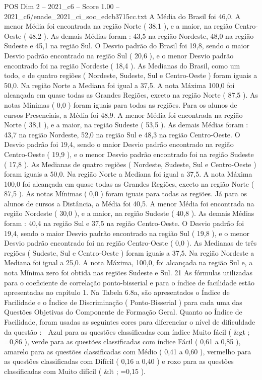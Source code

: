 \begin{textsample}{POS Dim 2 – 2021\_c6 – Score 1.00 – 2021\_c6/enade\_2021\_ci\_soc\_edcb3715cc.txt}
A Média do Brasil foi 46,0.
A menor Média foi encontrada na região Norte ( 38,1 ), e a maior, na região Centro-Oeste ( 48,2 ).
As demais Médias foram : 43,5 na região Nordeste, 48,0 na região Sudeste e 45,1 na região Sul.
O Desvio padrão do Brasil foi 19,8, sendo o maior Desvio padrão encontrado na região Sul ( 20,6 ), e o menor Desvio padrão encontrado foi na região Nordeste ( 18,4 ).
As Medianas do Brasil, como um todo, e de quatro regiões ( Nordeste, Sudeste, Sul e Centro-Oeste ) foram iguais a 50,0.
Na região Norte a Mediana foi igual a 37,5.
A nota Máxima 100,0 foi alcançada em quase todas as Grandes Regiões, exceto na região Norte ( 87,5 ).
As notas Mínimas ( 0,0 ) foram iguais para todas as regiões.
Para os alunos de cursos Presenciais, a Média foi 48,9.
A menor Média foi encontrada na região Norte ( 38,1 ), e a maior, na região Sudeste ( 53,5 ).
As demais Médias foram : 43,7 na região Nordeste, 52,0 na região Sul e 48,3 na região Centro-Oeste.
O Desvio padrão foi 19,4, sendo o maior Desvio padrão encontrado na região Centro-Oeste ( 19,9 ), e o menor Desvio padrão encontrado foi na região Sudeste ( 17,8 ).
As Medianas de quatro regiões ( Nordeste, Sudeste, Sul e Centro-Oeste ) foram iguais a 50,0.
Na região Norte a Mediana foi igual a 37,5.
A nota Máxima 100,0 foi alcançada em quase todas as Grandes Regiões, exceto na região Norte ( 87,5 ).
As notas Mínimas ( 0,0 ) foram iguais para todas as regiões.
Já para os alunos de cursos a Distância, a Média foi 40,5.
A menor Média foi encontrada na região Nordeste ( 30,0 ), e a maior, na região Sudeste ( 40,8 ).
As demais Médias foram : 40,4 na região Sul e 37,5 na região Centro-Oeste.
O Desvio padrão foi 19,4, sendo o maior Desvio padrão encontrado na região Sul ( 19,8 ), e o menor Desvio padrão encontrado foi na região Centro-Oeste ( 0,0 ).
As Medianas de três regiões ( Sudeste, Sul e Centro-Oeste ) foram iguais a 37,5.
Na região Nordeste a Mediana foi igual a 25,0.
A nota Máxima, 100,0, foi alcançada na região Sul e, a nota Mínima zero foi obtida nas regiões Sudeste e Sul. 21 As fórmulas utilizadas para o coeficiente de correlação ponto-bisserial e para o índice de facilidade estão apresentadas no capítulo 1.
Na Tabela 6.8a, são apresentados o Índice de Facilidade e o Índice de Discriminação ( Ponto-Bisserial ) para cada uma das Questões Objetivas do Componente de Formação Geral.
Quanto ao Índice de Facilidade, foram usadas as seguintes cores para diferenciar o nível de dificuldade da questão :  Azul para as questões classificadas com índice Muito fácil ( \&gt ; =0,86 ), verde para as questões classificadas com índice Fácil ( 0,61 a 0,85 ), amarelo para as questões classificadas com Médio ( 0,41 a 0,60 ), vermelho para as questões classificadas com Difícil ( 0,16 a 0,40 ) e roxo para as questões classificadas com Muito difícil ( \&lt ; =0,15 ).

\end{textsample}
